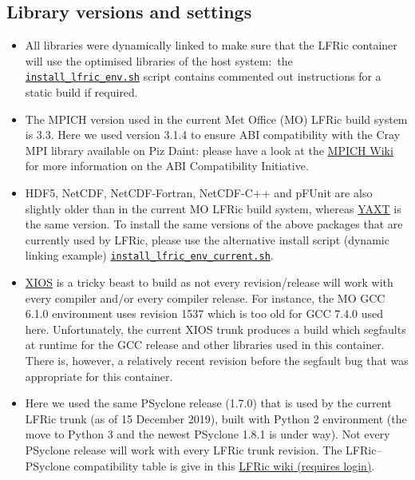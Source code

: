 \documentclass[twoside,a4paper,12pt]{article}
\begin{document}
\subsection{Library versions and settings}\label{lib_set}

\begin{itemize}

\item All libraries were dynamically linked to make sure that the LFRic container
will use the optimised libraries of the host system:\ the
\href{https://github.com/eth-cscs/ContainerHackathon/blob/master/LFRIC/docker/install_lfric_env.sh}
{\texttt{install\_lfric\_env.sh}} script contains commented out instructions for a static
build if required.

\item The MPICH version used in the current Met Office (MO) LFRic build system
is 3.3. Here we used version 3.1.4 to ensure ABI compatibility with the Cray MPI
library available on Piz Daint: please have a look at the
\href{https://wiki.mpich.org/mpich/index.php/ABI_Compatibility_Initiative}{MPICH Wiki}
for more information on the ABI Compatibility Initiative.

\item HDF5, NetCDF, NetCDF-Fortran, NetCDF-C++ and pFUnit are also slightly
older than in the current MO LFRic build system, whereas
\href{https://www.dkrz.de/redmine/projects/yaxt/}{YAXT} is the same
version. To install the same versions of the above packages that are currently
used by LFRic, please use the alternative install script (dynamic linking
example) \newline
\href{https://github.com/eth-cscs/ContainerHackathon/blob/master/LFRIC/docker/install_lfric_env_current.sh}
{\texttt{install\_lfric\_env\_current.sh}}.

\item \href{https://forge.ipsl.jussieu.fr/ioserver}{XIOS} is a tricky beast to
build as not every revision/release will work with every compiler and/or every
compiler release. For instance, the MO GCC 6.1.0 environment uses revision 1537
which is too old for GCC 7.4.0 used here. Unfortunately, the current XIOS trunk
produces a build which segfaults at runtime for the GCC release and other
libraries used in this container. There is, however, a relatively recent
revision before the segfault bug that was appropriate for this container.

\item Here we used the same PSyclone release (1.7.0) that is used by the current
LFRic trunk (as of 15 December 2019), built with Python 2 environment (the move
to Python 3 and the newest PSyclone 1.8.1 is under way). Not every PSyclone
release will work with every LFRic trunk revision. The LFRic--PSyclone
compatibility table is give in this
\href{https://code.metoffice.gov.uk/trac/lfric/wiki/LFRicTechnical/VersionsCompatibility}
{LFRic wiki (requires login)}.

\end{itemize}
%
%
\end{document}
